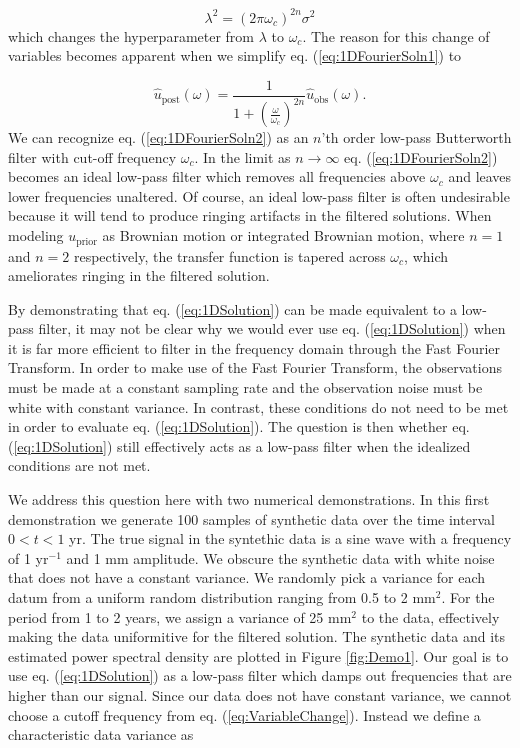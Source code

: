 \documentclass[10pt,a4paper]{article}
\begin{document}
\begin{equation}\label{eq:VariableChange}
\lambda^2 = (2\pi\omega_c)^{2n}\sigma^2
\end{equation}
which changes the hyperparameter from $\lambda$ to $\omega_c$.  The reason for this change of variables becomes apparent when we simplify eq. (\ref{eq:1DFourierSoln1}) to

\begin{equation}\label{eq:1DFourierSoln2}
\hat{u}_\mathrm{post}(\omega) = \frac{1}
                                  {1 + \left(\frac{\omega}{\omega_c}\right)^{2n}}
                                  \hat{u}_\mathrm{obs}(\omega).        
\end{equation}
We can recognize eq. (\ref{eq:1DFourierSoln2}) as an $n$'th order low-pass Butterworth filter with cut-off frequency $\omega_c$.  In the limit as $n\to \infty$ eq. (\ref{eq:1DFourierSoln2}) becomes an ideal low-pass filter which removes all frequencies above $\omega_c$ and leaves lower frequencies unaltered.  Of course, an ideal low-pass filter is often undesirable because it will tend to produce ringing artifacts in the filtered solutions.  When modeling $u_\mathrm{prior}$ as Brownian motion or integrated Brownian motion, where $n=1$ and $n=2$ respectively, the transfer function is tapered across $\omega_c$, which ameliorates ringing in the filtered solution.

By demonstrating that eq. (\ref{eq:1DSolution}) can be made equivalent to a low-pass filter, it may not be clear why we would ever use eq. (\ref{eq:1DSolution}) when it is far more efficient to filter in the frequency domain through the Fast Fourier Transform.  In order to make use of the Fast Fourier Transform, the observations must be made at a constant sampling rate and the observation noise must be  white with constant variance.  In contrast, these conditions do not need to be met in order to evaluate eq. (\ref{eq:1DSolution}).  The question is then whether eq. (\ref{eq:1DSolution}) still effectively acts as a low-pass filter when the idealized conditions are not met.  

We address this question here with two numerical demonstrations.  In this first demonstration we generate 100 samples of synthetic data over the time interval $0<t<1$ yr.  The true signal in the syntethic data is a sine wave with a frequency of 1 yr$^{-1}$ and 1 mm amplitude.  We obscure the synthetic data with white noise that does not have a constant variance.  We randomly pick a variance for each datum from a uniform random distribution ranging from 0.5 to 2 mm$^2$.  For the period from 1 to 2 years, we assign a variance of 25 mm$^2$ to the data, effectively making the data uniformitive for the filtered solution.  The synthetic data and its estimated power spectral density are plotted in Figure \ref{fig:Demo1}.  Our goal is to use eq. (\ref{eq:1DSolution}) as a low-pass filter which damps out frequencies that are higher than our signal.  Since our data does not have constant variance, we cannot choose a cutoff frequency from eq. (\ref{eq:VariableChange}).  Instead we define a characteristic data variance as
\end{document}
